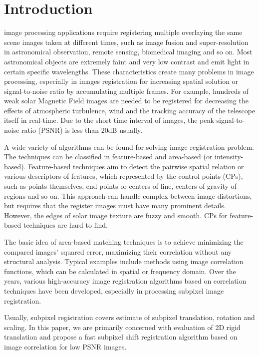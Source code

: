 \documentclass[conference]{IEEEtran}
\begin{document}

\section{Introduction}

 image processing applications require registering multiple overlaying the same scene images taken at different times, such as image fusion and super-resolution in astronomical observation, remote sensing, biomedical imaging and so on.  Most astronomical objects are extremely faint and very low contrast and emit light in certain specific wavelengths. These characteristics create many problems in image processing, especially in images registration for increasing spatial solution or signal-to-noise ratio by accumulating multiple frames. For example, hundreds of weak solar Magnetic Field images are needed to be registered for decreasing the effects of atmospheric turbulence, wind and the tracking accuracy of the telescope itself in real-time. Due to the short time interval of images, the peak signal-to-noise ratio (PSNR) is less than 20dB usually.

A wide variety of algorithms can be found for solving image registration problem. The techniques can be classified in feature-based and area-based (or intensity-based)\cite{cit:1}. Feature-based techniques aim to detect the pairwise spatial relation or various descriptors of features, which represented by the control points (CPs), such as points themselves, end points or centers of line, centers of gravity of regions and so on. This approach can handle complex between-image distortions, but requires that the register images must have many prominent details. However, the edges of solar image texture are fuzzy and smooth. CPs for feature-based techniques are hard to find.

The basic idea of area-based matching techniques is to achieve minimizing the compared images' squared error, maximizing their correlation without any structural analysis. Typical examples include methods using image correlation functions, which can be calculated in spatial or frequency domain. Over the years, various high-accuracy image registration algorithms based on correlation techniques have been developed, especially in processing subpixel image registration.

Usually, subpixel registration covers estimate of subpixel translation, rotation and scaling\cite{cit:2}. In this paper, we are primarily concerned with evaluation of 2D rigid translation and propose a fast subpixel shift registration algorithm based on image correlation for low PSNR images.
\end{document}
